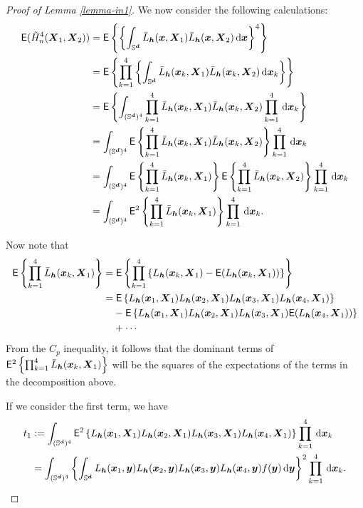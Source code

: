 \documentclass[oneside,11pt]{article}
\begin{document}
\begin{proof}[Proof of Lemma \ref{lemma-in1}]
We now consider the following calculations:
\begin{align*}
    \mathsf{E} ( \tilde{H}_n^4(\bX_1, \bX_2)) &= \mathsf{E}\lrb{ \lrb{\int_{\Sr} \bar{L}_{\bh} (\bx,\bX_1) \bar{L}_{\bh} (\bx,\bX_2) \,\rd \bx}^4 } \\
    &= \mathsf{E}\lrb{ \prod_{k=1}^{4} \lrb{\int_{\Sr} \bar{L}_{\bh} (\bx_k,\bX_1) \bar{L}_{\bh} (\bx_k,\bX_2) \,\rd \bx_k} } \\ 
    &= \mathsf{E} \lrb{\int_{(\Sr)^4} \prod_{k=1}^{4}\bar{L}_{\bh} (\bx_k,\bX_1) \bar{L}_{\bh} (\bx_k,\bX_2) \prod_{k=1}^{4} \,\rd \bx_k}  \\
    &= \int_{(\Sr)^4} \mathsf{E} \lrb{ \prod_{k=1}^{4}\bar{L}_{\bh} (\bx_k,\bX_1) \bar{L}_{\bh} (\bx_k,\bX_2) }\prod_{k=1}^{4} \,\rd \bx_k  \\
    &= \int_{(\Sr)^4} \mathsf{E} \lrb{ \prod_{k=1}^{4}\bar{L}_{\bh} (\bx_k,\bX_1)} \mathsf{E} \lrb{ \prod_{k=1}^{4} \bar{L}_{\bh} (\bx_k,\bX_2) }\prod_{k=1}^{4} \,\rd \bx_k  \\
    &= \int_{(\Sr)^4} \mathsf{E}^2 \lrb{ \prod_{k=1}^{4}\bar{L}_{\bh} (\bx_k,\bX_1)} \prod_{k=1}^{4} \,\rd \bx_k.
\end{align*}

Now note that
\begin{align*}
    \mathsf{E} \lrb{ \prod_{k=1}^{4}\bar{L}_{\bh} (\bx_k,\bX_1)} =&\; \mathsf{E} \lrb{ \prod_{k=1}^{4} \lrb{ L_{\bh} (\bx_k,\bX_1) - \mathsf{E} (L_{\bh} (\bx_k,\bX_1)) } } \\
    =&\; \mathsf{E} \lrb{ L_{\bh} (\bx_1,\bX_1) L_{\bh} (\bx_2,\bX_1) L_{\bh} (\bx_3,\bX_1) L_{\bh} (\bx_4,\bX_1)}  \\
    &- \mathsf{E} \lrb{ L_{\bh} (\bx_1,\bX_1) L_{\bh} (\bx_2,\bX_1) L_{\bh} (\bx_3,\bX_1) \mathsf{E} (L_{\bh} (\bx_4,\bX_1))} \\
    &+ \cdots
\end{align*}
From the $C_p$ inequality, it follows that the dominant terms of $\mathsf{E}^2 \lrb{ \prod_{k=1}^{4}\bar{L}_{\bh} (\bx_k,\bX_1)}$ will be the squares of the expectations of the terms in the decomposition above.

If we consider the first term, we have
\begin{align*}
    t_1 &\defin \int_{(\Sr)^4} \mathsf{E}^2 \lrb{ L_{\bh} (\bx_1,\bX_1) L_{\bh} (\bx_2,\bX_1) L_{\bh} (\bx_3,\bX_1) L_{\bh} (\bx_4,\bX_1)} \prod_{k=1}^{4} \,\rd \bx_k \\
    &= \int_{(\Sr)^4} \lrb{ \int_{\Sr}L_{\bh} (\bx_1,\by) L_{\bh} (\bx_2,\by) L_{\bh} (\bx_3,\by) L_{\bh} (\bx_4,\by) f(\by) \,\rd \by }^2 \prod_{k=1}^{4} \,\rd \bx_k.
\end{align*}


\end{proof}
\end{document}
